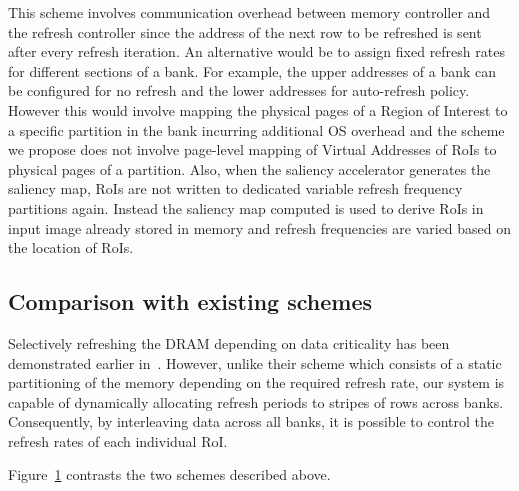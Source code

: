 This scheme involves communication overhead between memory controller and the refresh controller since the address of the next row to be refreshed is sent after every refresh iteration. An alternative would be to assign fixed refresh rates for different sections of a bank. For example, the upper addresses of a bank can be configured for no refresh and the lower addresses for auto-refresh policy. However this would involve mapping the physical pages of a Region of Interest to a specific partition in the bank incurring additional OS overhead and the scheme we propose does not involve page-level mapping of Virtual Addresses of RoIs to physical pages of a partition. Also, when the saliency accelerator generates the saliency map, RoIs are not written to dedicated variable refresh frequency partitions again. Instead the saliency map computed is used to derive RoIs in input image already stored in memory and refresh frequencies are varied based on the location of RoIs. 

\subsection{Comparison with existing schemes}
Selectively refreshing the DRAM depending on data criticality has been demonstrated earlier in~\cite{Liu2011}. However, unlike their scheme which consists of a static partitioning of the memory depending on the required refresh rate, our system is capable of dynamically allocating refresh periods to stripes of rows across banks. Consequently, by interleaving data across all banks, it is possible to control the refresh rates of each individual RoI. 

Figure~\ref{fig:reva-refresh} contrasts the two schemes described above.

\begin{figure}[ht!]
\centering
{}
\caption{\label{fig:reva-refresh} }
\end{figure}
